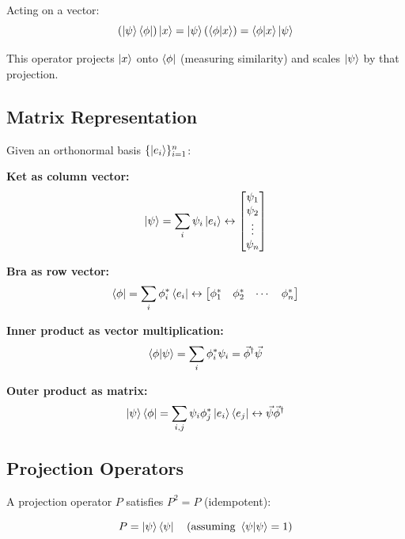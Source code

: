 \documentclass[11pt,a4paper]{article}
\theoremstyle{definition}
\begin{document}
Acting on a vector:
\begin{equation}
(\ket{\psi}\bra{\phi}) \ket{x} = \ket{\psi} (\braket{\phi|x}) = \braket{\phi|x} \ket{\psi}
\end{equation}

This operator projects $\ket{x}$ onto $\bra{\phi}$ (measuring similarity) and scales $\ket{\psi}$ by that projection.

\subsection{Matrix Representation}

Given an orthonormal basis $\{\ket{e_i}\}_{i=1}^n$:

\textbf{Ket as column vector:}
\begin{equation}
\ket{\psi} = \sum_i \psi_i \ket{e_i} \leftrightarrow \begin{bmatrix} \psi_1 \\ \psi_2 \\ \vdots \\ \psi_n \end{bmatrix}
\end{equation}

\textbf{Bra as row vector:}
\begin{equation}
\bra{\phi} = \sum_i \phi_i^* \bra{e_i} \leftrightarrow \begin{bmatrix} \phi_1^* & \phi_2^* & \cdots & \phi_n^* \end{bmatrix}
\end{equation}

\textbf{Inner product as vector multiplication:}
\begin{equation}
\braket{\phi|\psi} = \sum_i \phi_i^* \psi_i = \vec{\phi}^\dagger \vec{\psi}
\end{equation}

\textbf{Outer product as matrix:}
\begin{equation}
\ket{\psi}\bra{\phi} = \sum_{i,j} \psi_i \phi_j^* \ket{e_i}\bra{e_j} \leftrightarrow \vec{\psi} \vec{\phi}^\dagger
\end{equation}

\subsection{Projection Operators}

A projection operator $P$ satisfies $P^2 = P$ (idempotent):

\begin{equation}
P = \ket{\psi}\bra{\psi} \quad \text{(assuming } \braket{\psi|\psi} = 1\text{)}
\end{equation}
\end{document}
